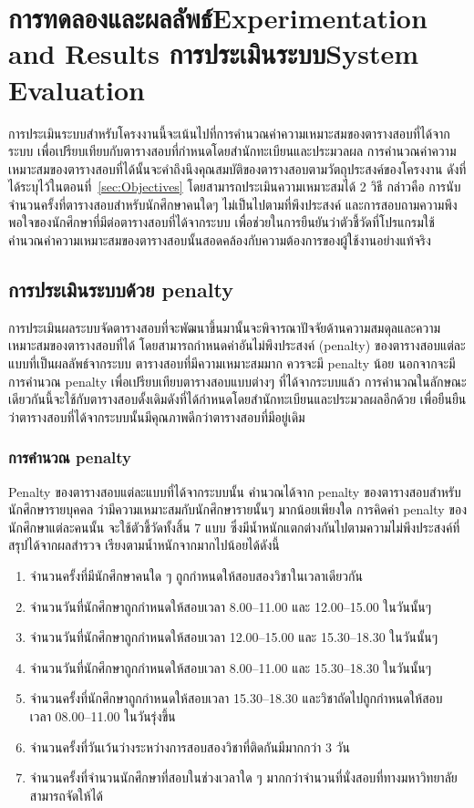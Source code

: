 \chapter{\ifproject%
\ifcpe การทดลองและผลลัพธ์\else Experimentation and Results\fi
\else%
\ifcpe การประเมินระบบ\else System Evaluation\fi
\fi}

การประเมินระบบสำหรับโครงงานนี้จะเน้นไปที่การคำนวณค่าความเหมาะสมของตารางสอบที่ได้จากระบบ เพื่อเปรียบเทียบกับตารางสอบที่กำหนดโดยสำนักทะเบียนและประมวลผล 
\enskip การคำนวณค่าความเหมาะสมของตารางสอบที่ได้นั้นจะคำถึงนึงคุณสมบัติของตารางสอบตามวัตถุประสงค์ของโครงงาน ดังที่ได้ระบุไว้ในตอนที่~\ref{sec:Objectives} 
โดยสามารถประเมินความเหมาะสมได้ 2 วิธี กล่าวคือ การนับจำนวนครั้งที่ตารางสอบสำหรับนักศึกษาคนใดๆ ไม่เป็นไปตามที่พึงประสงค์ และการสอบถามความพึงพอใจของนักศึกษาที่มีต่อตารางสอบที่ได้จากระบบ เพื่อช่วยในการยืนยันว่าตัวชี้วัดที่โปรแกรมใช้คำนวณค่าความเหมาะสมของตารางสอบนั้นสอดคล้องกับความต้องการของผู้ใช้งานอย่างแท้จริง

\section{การประเมินระบบด้วย penalty}
การประเมินผลระบบจัดตารางสอบที่จะพัฒนาขึ้นมานั้นจะพิจารณาปัจจัยด้านความสมดุลและความเหมาะสมของตารางสอบที่ได้ โดยสามารถกำหนดค่าอันไม่พึงประสงค์ (penalty) ของตารางสอบแต่ละแบบที่เป็นผลลัพธ์จากระบบ
\enskip ตารางสอบที่มีความเหมาะสมมาก ควรจะมี penalty น้อย
\enskip นอกจากจะมีการคำนวณ penalty เพื่อเปรียบเทียบตารางสอบแบบต่างๆ ที่ได้จากระบบแล้ว การคำนวณในลักษณะเดียวกันนี้จะใช้กับตารางสอบดั้งเดิมดังที่ได้กำหนดโดยสำนักทะเบียนและประมวลผลอีกด้วย เพื่อยืนยืนว่าตารางสอบที่ได้จากระบบนั้นมีคุณภาพดีกว่าตารางสอบที่มีอยู่เดิม

\subsection{การคำนวณ penalty}
Penalty ของตารางสอบแต่ละแบบที่ได้จากระบบนั้น คำนวณได้จาก penalty ของตารางสอบสำหรับนักศึกษารายบุคคล ว่ามีความเหมาะสมกับนักศึกษารายนั้นๆ มากน้อยเพียงใด \enskip 
การคิดค่า penalty ของนักศึกษาแต่ละคนนั้น จะใช้ตัวชี้วัดทั้งสิ้น 7 แบบ ซึ่งมีน้ำหนักแตกต่างกันไปตามความไม่พึงประสงค์ที่สรุปได้จากผลสำรวจ เรียงตามน้ำหนักจากมากไปน้อยได้ดังนี้
\begin{enumerate}
    \item จำนวนครั้งที่มีนักศึกษาคนใด ๆ ถูกกำหนดให้สอบสองวิชาในเวลาเดียวกัน
    \item จำนวนวันที่นักศึกษาถูกกำหนดให้สอบเวลา 8.00--11.00 และ 12.00--15.00 ในวันนั้นๆ
    \item จำนวนวันที่นักศึกษาถูกกำหนดให้สอบเวลา 12.00--15.00 และ 15.30--18.30 ในวันนั้นๆ
    \item จำนวนวันที่นักศึกษาถูกกำหนดให้สอบเวลา 8.00--11.00 และ 15.30--18.30 ในวันนั้นๆ
    \item จำนวนครั้งที่นักศึกษาถูกกำหนดให้สอบเวลา 15.30--18.30 และวิชาถัดไปถูกกำหนดให้สอบ เวลา 08.00--11.00 ในวันรุ่งขึ้น
    \item จำนวนครั้งที่วันเว้นว่างระหว่างการสอบสองวิชาที่ติดกันมีมากกว่า 3 วัน
    \item จํานวนครั้งที่จำนวนนักศึกษาที่สอบในช่วงเวลาใด ๆ มากกว่าจํานวนที่นั่งสอบที่ทางมหาวิทยาลัยสามารถจัดให้ได้
\end{enumerate}

